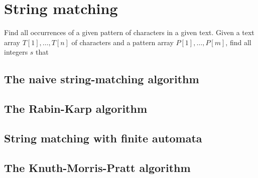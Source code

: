 \documentclass[letter]{book}
\theoremstyle{definition}
\theoremstyle{definition}
\theoremstyle{remark}
\begin{document}
\setcounter{chapter}{31}

\chapter{String matching}
Find all occurrences of a given pattern of characters in a given text.
Given a text array $T[1],\ldots,T[n]$ of characters and a pattern array $P[1],\ldots,P[m]$, find all integers $s$ that 
\section{The naive string-matching algorithm}
\section{The Rabin-Karp algorithm}
\section{String matching with finite automata}
\section{The Knuth-Morris-Pratt algorithm}
\end{document}
